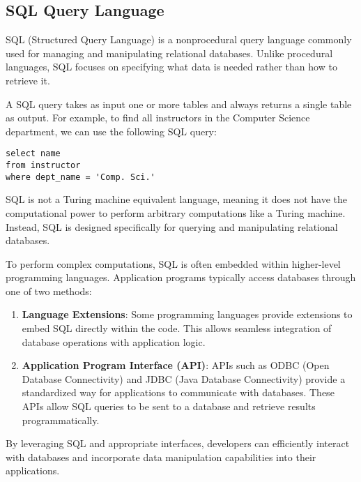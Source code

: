 \documentclass{article}
\begin{document}
\newpage




\subsection*{SQL Query Language}

SQL (Structured Query Language) is a nonprocedural query language commonly used for managing and manipulating relational databases. Unlike procedural languages, SQL focuses on specifying what data is needed rather than how to retrieve it.

A SQL query takes as input one or more tables and always returns a single table as output. For example, to find all instructors in the Computer Science department, we can use the following SQL query:

\begin{verbatim}
select name
from instructor
where dept_name = 'Comp. Sci.'
\end{verbatim}

SQL is not a Turing machine equivalent language, meaning it does not have the computational power to perform arbitrary computations like a Turing machine. Instead, SQL is designed specifically for querying and manipulating relational databases.

To perform complex computations, SQL is often embedded within higher-level programming languages. Application programs typically access databases through one of two methods:

\begin{enumerate}
    \item \textbf{Language Extensions}: Some programming languages provide extensions to embed SQL directly within the code. This allows seamless integration of database operations with application logic.
    
    \item \textbf{Application Program Interface (API)}: APIs such as ODBC (Open Database Connectivity) and JDBC (Java Database Connectivity) provide a standardized way for applications to communicate with databases. These APIs allow SQL queries to be sent to a database and retrieve results programmatically.
\end{enumerate}

By leveraging SQL and appropriate interfaces, developers can efficiently interact with databases and incorporate data manipulation capabilities into their applications.
\end{document}
